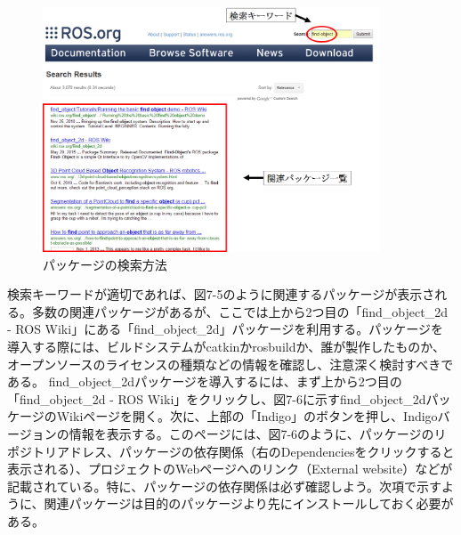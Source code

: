 \begin{figure}[htp]
  \centering
  \includegraphics[width=10cm]{pictures/chapter7/pic_07_05.png}
  \caption{パッケージの検索方法}
\end{figure}

検索キーワードが適切であれば、図7-5のように関連するパッケージが表示される。多数の関連パッケージがあるが、ここでは上から2つ目の「find\_object\_2d - ROS Wiki」にある「find\_object\_2d」パッケージを利用する。パッケージを導入する際には、ビルドシステムがcatkinかrosbuildか、誰が製作したものか、オープンソースのライセンスの種類などの情報を確認し、注意深く検討すべきである。
find\_object\_2dパッケージを導入するには、まず上から2つ目の「find\_object\_2d - ROS Wiki」をクリックし、図7-6に示すfind\_object\_2dパッケージのWikiページを開く。次に、上部の「Indigo」のボタンを押し、Indigoバージョンの情報を表示する。このページには、図7-6のように、パッケージのリポジトリアドレス、パッケージの依存関係（右のDependenciesをクリックすると表示される）、プロジェクトのWebページへのリンク（External website）などが記載されている。特に、パッケージの依存関係は必ず確認しよう。次項で示すように、関連パッケージは目的のパッケージより先にインストールしておく必要がある。

